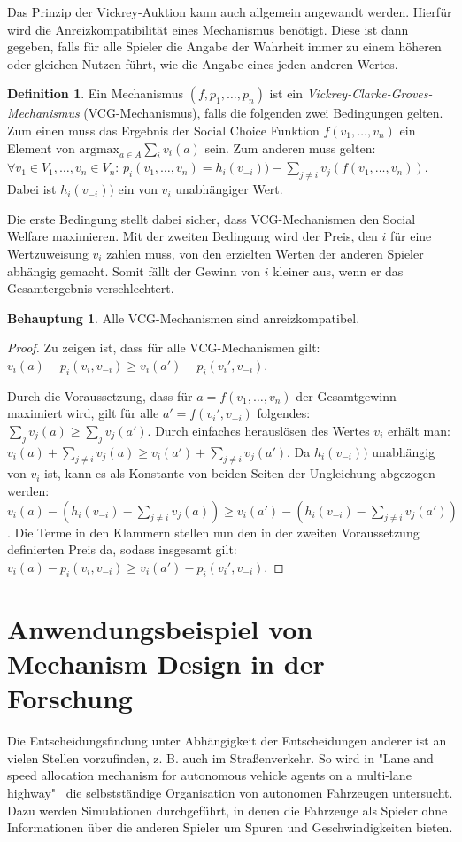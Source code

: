 \documentclass[a4paper,11pt]{article}
\theoremstyle{definition}
\newtheorem{definition}{Definition}
\theoremstyle{plain}
\theoremstyle{definition}
\newtheorem{claim}{Behauptung}
\begin{document}
Das Prinzip der Vickrey-Auktion kann auch allgemein angewandt werden. Hierfür wird die Anreizkompatibilität eines Mechanismus benötigt. Diese ist dann gegeben, falls für alle Spieler die Angabe der Wahrheit immer zu einem höheren oder gleichen Nutzen führt, wie die Angabe eines jeden anderen Wertes.

\begin{definition}
	\label{def:vcg}
	Ein Mechanismus $(f, p_1,\ldots,p_n)$ ist ein \emph{Vickrey-Clarke-Groves-Mechanismus} (VCG-Mechanismus), falls die folgenden zwei Bedingungen gelten.
	Zum einen muss das Ergebnis der Social Choice Funktion $f(v_1,\ldots , v_n)$ ein Element von $\text{argmax}_{a\in A} \sum_i v_i(a)$ sein.
	Zum anderen muss gelten: $\forall v_1 \in V_1,\ldots,v_n\in V_n$: $p_i(v_1,\ldots,v_n)=h_i(v_{-i})) - \sum_{j\neq i}v_j(f(v_1,\ldots,v_n))$. Dabei ist $h_i(v_{-i}))$ ein von $v_i$ unabhängiger Wert.
\end{definition}

Die erste Bedingung stellt dabei sicher, dass VCG-Mechanismen den Social Welfare maximieren. Mit der zweiten Bedingung wird der Preis, den $i$ für eine Wertzuweisung $v_i$ zahlen muss, von den erzielten Werten der anderen Spieler abhängig gemacht. Somit fällt der Gewinn von $i$ kleiner aus, wenn er das Gesamtergebnis verschlechtert.

\begin{claim}
	Alle VCG-Mechanismen sind anreizkompatibel.
\end{claim}

\begin{proof}
	Zu zeigen ist, dass für alle VCG-Mechanismen gilt: $v_i(a)-p_i(v_i, v_{-i})\geq v_i(a')-p_i(v_i', v_{-i})$. 
	
	Durch die Voraussetzung, dass für $a = f(v_1,\ldots,v_n)$ der Gesamtgewinn maximiert wird, gilt für alle $a'=f(v_i',v_{-i})$ folgendes: $\sum_{j} v_j(a) \geq \sum_{j} v_j(a')$. Durch einfaches herauslösen des Wertes $v_i$ erhält man: $v_i(a)+\sum_{j\neq i} v_j(a) \geq v_i(a') + \sum_{j\neq i} v_j(a')$. Da $h_i(v_{-i}))$ unabhängig von $v_i$ ist, kann es als Konstante von beiden Seiten der Ungleichung abgezogen werden: $v_i(a)-(h_i(v_{-i}) - \sum_{j\neq i} v_j(a)) \geq v_i(a') -(h_i(v_{-i}) - \sum_{j\neq i} v_j(a'))$. Die Terme in den Klammern stellen nun den in der zweiten Voraussetzung definierten Preis da, sodass insgesamt gilt: $v_i(a)-p_i(v_i, v_{-i})\geq v_i(a')-p_i(v_i', v_{-i})$. 
\end{proof}

\section{Anwendungsbeispiel von Mechanism Design in der Forschung}
Die Entscheidungsfindung unter Abhängigkeit der Entscheidungen anderer ist an vielen Stellen vorzufinden, z. B. auch im Straßenverkehr. So wird in "Lane and speed allocation mechanism for autonomous vehicle agents on a multi-lane highway"~\cite{lov21} die selbstständige Organisation von autonomen Fahrzeugen untersucht. Dazu werden Simulationen durchgeführt, in denen die Fahrzeuge als Spieler ohne Informationen über die anderen Spieler um Spuren und Geschwindigkeiten bieten.



\end{document}

